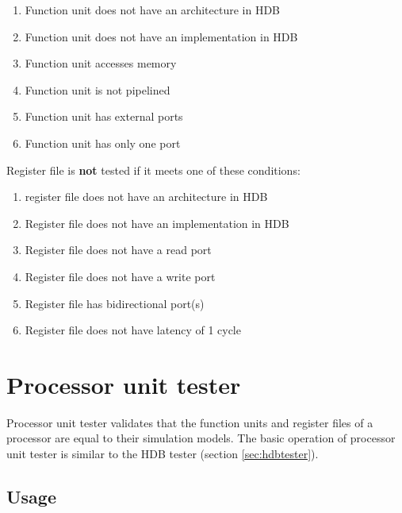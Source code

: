 \documentclass[a4paper,twoside]{tceusermanual}
\begin{document}
\begin{enumerate}
 \item Function unit does not have an architecture in HDB

 \item Function unit does not have an implementation in HDB

 \item Function unit accesses memory

 \item Function unit is not pipelined

 \item Function unit has external ports

 \item Function unit has only one port
\end{enumerate}

Register file is \textbf{not} tested if it meets one of these conditions:

\begin{enumerate}
 \item register file does not have an architecture in HDB

 \item Register file does not have an implementation in HDB

 \item Register file does not have a read port

 \item Register file does not have a write port

 \item Register file has bidirectional port(s)

 \item Register file does not have latency of 1 cycle
\end{enumerate}


\section{Processor unit tester}

Processor unit tester validates that the function units and register files of
a processor are equal to their simulation models. The basic operation of processor
unit tester is similar to the HDB tester (section \ref{sec:hdbtester}).

\subsection{Usage}
\end{document}
